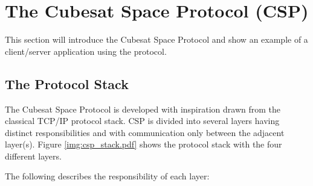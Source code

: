 \chapter{The Cubesat Space Protocol (CSP)}
\label{chapter:csp}
This section will introduce the Cubesat Space Protocol and show an example of a client/server application using the protocol.

\section{The Protocol Stack}
The Cubesat Space Protocol is developed with inspiration drawn from the classical TCP/IP protocol stack. CSP is divided into several layers having distinct responsibilities and with communication only between the adjacent layer(s). Figure \ref{img:csp_stack.pdf} shows the protocol stack with the four different layers.


The following describes the responsibility of each layer:

